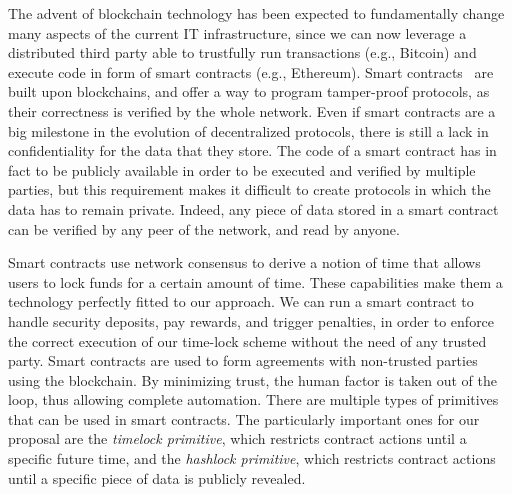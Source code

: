The advent of blockchain technology has been expected to fundamentally change many aspects of the current IT infrastructure, since we can now leverage a distributed third party able to trustfully run transactions (e.g., Bitcoin) and execute code in form of smart contracts (e.g., Ethereum).
Smart contracts~\cite{szabo1997formalizing} are built upon blockchains, and offer a way to program tamper-proof protocols, as their correctness is verified by the whole network.
Even if smart contracts are a big milestone in the evolution of decentralized protocols, there is still a lack in confidentiality for the data that they store. The code of a smart contract has in fact to be publicly available in order to be executed and verified by multiple parties, but this requirement makes it difficult to create protocols in which the data has to remain private.
Indeed, any piece of data stored in a smart contract can be verified by any peer of the network, and read by anyone.
%
%

%
Smart contracts use network consensus to derive a notion of time that allows users to lock funds for a certain amount of time. These capabilities make them a technology perfectly fitted to our approach. We can run a smart contract to handle security deposits, pay rewards, and trigger penalties, in order to enforce the correct execution of our time-lock scheme without the need of any trusted party.
%
Smart contracts are used to form agreements with non-trusted parties using the blockchain. By minimizing trust, the human factor is taken out of the loop, thus allowing complete automation.
There are multiple types of primitives that can be used in smart contracts. The particularly important ones for our proposal are the {\em timelock primitive}, which restricts contract actions until a specific future time, and the {\em hashlock primitive}, which restricts contract actions until a specific piece of data is publicly revealed.

